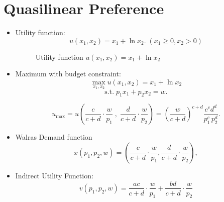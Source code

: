 \documentclass[
12pt, %
a4paper, %
onecolumn, %
portrait %
]{article}
\begin{document}
\section{Quasilinear Preference}
\begin{itemize}
	
\item Utility function:
\[
u(x_1,x_2)=x_1+\ln x_2.\;(x_1\ge0,x_2> 0)
\]

\begin{figure}[H]
	\centering
	\caption{Utility function $u(x_1,x_2)=x_1+\ln x_2$}
	\label{Fig.lable}
\end{figure}

\item Maximum with budget constraint:
\[
\max_{x_1,x_2} u(x_1,x_2)=x_1+\ln x_2
\]
\[
\text{s.t.}\;p_1x_1+p_2x_2=w.
\]

\[
u_{\max}=u\left(\frac{c}{c+d}\cdot\frac{w}{p_1}\;,\;\frac{d}{c+d}\cdot\frac{w}{p_2}\right)=\left(\frac{w}{c+d}\right)^{c+d}\frac{c^cd^d}{p_1^c\,p_2^d}.
\]
	
\item Walras Demand function
\[
x(p_1,p_2,w)=\left(\frac{c}{c+d}\cdot\frac{w}{p_1},\frac{d}{c+d}\cdot\frac{w}{p_2}\right),
\]
\item Indirect Utility Function:
\[
v(p_1,p_2,w)=\frac{ac}{c+d}\cdot\frac{w}{p_1}+\frac{bd}{c+d}\cdot\frac{w}{p_2}
\]


\end{itemize}
\end{document}
